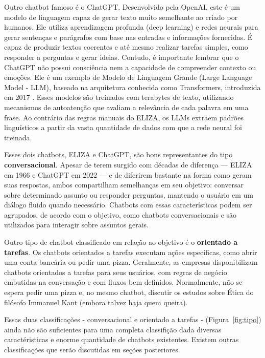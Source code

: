 \documentclass[14pt,a4paper,oneside]{book}
\begin{document}
Outro chatbot famoso é o ChatGPT. Desenvolvido pela OpenAI, este é um modelo de linguagem capaz de gerar texto muito semelhante ao criado por humanos. Ele utiliza aprendizagem profunda (deep learning) e redes neurais para gerar sentenças e parágrafos com base nas entradas e informações fornecidas. É capaz de produzir textos coerentes e até mesmo realizar tarefas simples, como responder a perguntas e gerar ideias. Contudo, é importante lembrar que o ChatGPT não possui consciência nem a capacidade de compreender contexto ou emoções. Ele é um exemplo de Modelo de Linguagem Grande (Large Language Model - LLM), baseado na arquitetura conhecida como Transformers, introduzida em 2017 \cite{Vaswani2017}. Esses modelos são treinados com terabytes de texto, utilizando mecanismos de autoatenção que avaliam a relevância de cada palavra em uma frase. Ao contrário das regras manuais do ELIZA, os LLMs extraem padrões linguísticos a partir da vasta quantidade de dados com que a rede neural foi treinada.

Esses dois chatbots, ELIZA e ChatGPT, são bons representantes do tipo \textbf{conversacional}. 
Apesar de terem surgido com décadas de diferença — ELIZA em 1966 e ChatGPT em 2022 — e de diferirem bastante na forma como geram suas respostas, ambos compartilham semelhanças em seu objetivo: conversar sobre determinado assunto ou responder perguntas, mantendo o usuário em um diálogo fluido quando necessário. Chatbots com essas características podem ser agrupados, de acordo com o objetivo, como chatbots conversacionais e são utilizados para interagir sobre assuntos gerais.

Outro tipo de chatbot classificado em relação ao objetivo é o \textbf{orientado a tarefas}. Os chatbots orientados a tarefas executam ações específicas, como abrir uma conta bancária ou pedir uma pizza. Geralmente, as empresas disponibilizam chatbots orientados a tarefas para seus usuários, com regras de negócio embutidas na conversação e com fluxos bem definidos. Normalmente, não se espera pedir uma pizza e, no mesmo chatbot, discutir os estudos sobre Ética do filósofo Immanuel Kant (embora talvez haja quem queira). 

Essas duas classificações - conversacional e orientado a tarefas - (Figura~\ref{fig:tipo}) ainda não são suficientes para uma completa classifição dada diversas caractéristicas e enorme quantidade de chatbots existentes. Existem outras classificações que serão discutidas em seções posteriores.
\end{document}

